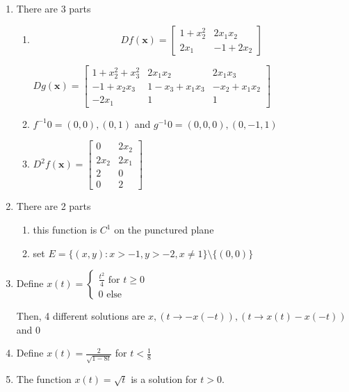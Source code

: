 \documentclass{article}
\begin{document}
\begin{enumerate}
    \item There are 3 parts
    
        \begin{enumerate}
            \item 
            
            \[Df(\mathbf{x}) = \begin{bmatrix} 1 + x_2^2 & 2x_1x_2 \\ 2x_1 & -1 + 2x_2 \end{bmatrix}\]
    
            $Dg(\mathbf{x}) = \begin{bmatrix} 
            1 + x_2^2 + x_3^2 & 2x_1x_2 & 2x_1x_3 \\ 
            -1 + x_2x_3 & 1 - x_3 + x_1x_3 & -x_2 + x_1x_2 \\ 
            -2x_1 & 1 & 1 
            \end{bmatrix}$ 
    
            \item $f^{-1}0=(0,0),(0,1)$ and $g^{-1}0=(0,0,0),(0,-1,1)$
    
            \item $D^2f(\mathbf{x})=\begin{bmatrix}
                0&2x_2 \\
                2x_2&2x_1 \\
                2&0 \\
                0&2
            \end{bmatrix}$
        
        \end{enumerate}

    \item There are 2 parts
        \begin{enumerate}
            \item this function is $C^1$ on the punctured plane
            \item set $E=\{(x,y):x>-1,y>-2,x \neq 1\} \setminus \{(0,0)\}$
        \end{enumerate}

    \item 
        Define $x(t)=\begin{cases}
        \frac{t^2}{4} \text{ for }t \geq0 \\
        0 \text{ else }
    \end{cases}$

    Then, 4 different solutions are $x,(t \to -x(-t)),(t \to x(t) -x(-t))$ and $0$

    \item Define $x(t)=\frac{2}{\sqrt{1-8t}}$ for $t<\frac{1}{8}$
    \item The function $x(t)=\sqrt{t}$ is a solution for $t>0$.
    
    \end{enumerate}
\end{document}
